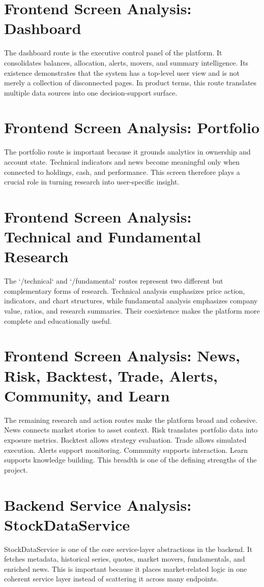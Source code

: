 \documentclass[12pt,a4paper]{report}
\begin{document}
\section{Frontend Screen Analysis: Dashboard}
The dashboard route is the executive control panel of the platform. It consolidates balances, allocation, alerts, movers, and summary intelligence. Its existence demonstrates that the system has a top-level user view and is not merely a collection of disconnected pages. In product terms, this route translates multiple data sources into one decision-support surface.

\section{Frontend Screen Analysis: Portfolio}
The portfolio route is important because it grounds analytics in ownership and account state. Technical indicators and news become meaningful only when connected to holdings, cash, and performance. This screen therefore plays a crucial role in turning research into user-specific insight.

\section{Frontend Screen Analysis: Technical and Fundamental Research}
The `/technical` and `/fundamental` routes represent two different but complementary forms of research. Technical analysis emphasizes price action, indicators, and chart structures, while fundamental analysis emphasizes company value, ratios, and research summaries. Their coexistence makes the platform more complete and educationally useful.

\section{Frontend Screen Analysis: News, Risk, Backtest, Trade, Alerts, Community, and Learn}
The remaining research and action routes make the platform broad and cohesive. News connects market stories to asset context. Risk translates portfolio data into exposure metrics. Backtest allows strategy evaluation. Trade allows simulated execution. Alerts support monitoring. Community supports interaction. Learn supports knowledge building. This breadth is one of the defining strengths of the project.

\section{Backend Service Analysis: StockDataService}
StockDataService is one of the core service-layer abstractions in the backend. It fetches metadata, historical series, quotes, market movers, fundamentals, and enriched news. This is important because it places market-related logic in one coherent service layer instead of scattering it across many endpoints.
\end{document}
